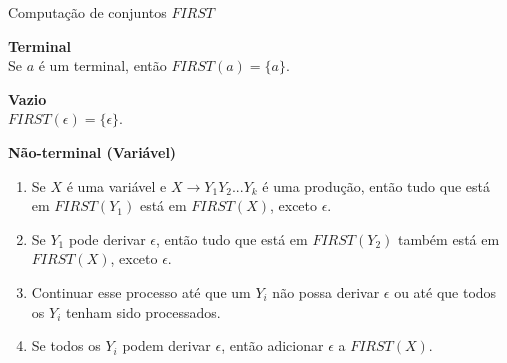 \begin{frame}{Computação de conjuntos $FIRST$}

{\bf Terminal}\\
Se $a$ é um terminal, então $FIRST(a) = \{a\}$.\bigskip

{\bf Vazio}\\
$FIRST(\epsilon) = \{\epsilon\}$.\bigskip

{\bf Não-terminal (Variável)}\\
\begin{enumerate}
 \item Se $X$ é uma variável e $X \rightarrow Y_1 Y_2 ... Y_k$ é uma produção, 
      então tudo que está em $FIRST(Y_1)$ está em $FIRST(X)$, exceto $\epsilon$. 
 \item Se $Y_1$ pode derivar $\epsilon$, então tudo que está em $FIRST(Y_2)$ 
       também está em $FIRST(X)$, exceto $\epsilon$. 
\item Continuar esse processo até que um $Y_i$ não possa 
      derivar $\epsilon$ ou até que todos os $Y_i$ tenham sido processados. 
\item Se todos os $Y_i$ podem derivar $\epsilon$, então adicionar $\epsilon$ a $FIRST(X)$.
\end{enumerate}

\end{frame}

